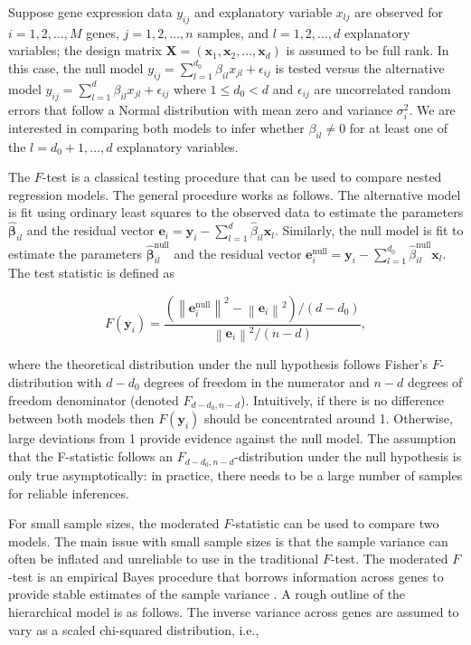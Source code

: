 \documentclass[11pt]{article}
\begin{document}
Suppose gene expression data $y_{ij}$ and explanatory variable $x_{lj}$ are observed for $i=1,2,...,M$ genes, $j=1,2,..., n$ samples, and $l = 1,2,...,d$ explanatory variables; the design matrix $\mathbf{X} = (\mathbf{x}_{1}, \mathbf{x}_{2}, ..., \mathbf{x}_{d})$ is assumed to be full rank. In this case, the null model $y_{ij} = \sum_{l=1}^{d_{0}} \beta_{il}x_{jl} + \epsilon_{ij}$ is tested versus the alternative model $y_{ij} = \sum_{l=1}^{d} \beta_{il}x_{jl} + \epsilon_{ij}$ where $1\leq d_{0}<d$ and $\epsilon_{ij}$ are uncorrelated random errors that follow a Normal distribution with mean zero and variance $\sigma_{i}^{2}$. We are interested in comparing both models to infer whether $\beta_{il} \neq 0$ for at least one of the $l=d_{0} + 1, ...,d$ explanatory variables.

The $F$-test is a classical testing procedure that can be used to compare nested regression models. The general procedure works as follows. The alternative model is fit using ordinary least squares to the observed data to estimate the parameters $\hat{\mathbf{\beta}}_{il}$ and the residual vector $\mathbf{e}_{i} = \mathbf{y}_{i} - \sum_{l=1}^{d} \hat{\beta}_{il} \mathbf{x}_{l}$. Similarly, the null model is fit to estimate the parameters $\hat{\mathbf{\beta}}^{\text{null}}_{il}$ and the residual vector $\mathbf{e}^{\text{null}}_{i}= \mathbf{y}_{i} - \sum_{l=1}^{d_{0}} \hat{\beta}^{\text{null}} _{il} \mathbf{x}_{l}$. The test statistic is defined as 

\begin{equation}
F(\mathbf{y}_{i}) = \dfrac{\left(\left\lVert \mathbf{e}^{\text{null}}_{i}\right\rVert ^{2} -\left\lVert \mathbf{e}_{i} \right\rVert ^ {2} \right)/(d-d_{0})}{\left\lVert \mathbf{e}_{i} \right\rVert ^ {2}/(n-d)},
\end{equation}

\noindent where the theoretical distribution under the null hypothesis follows Fisher's $F$-distribution with $d-d_{0}$ degrees of freedom in the numerator and $n-d$ degrees of freedom denominator (denoted $F_{d-d_{0}, n-d}$). Intuitively, if there is no difference between both models then $F(\mathbf{y}_{i})$ should be concentrated around 1. Otherwise, large deviations from 1 provide evidence against the null model. The assumption that the F-statistic follows an $F_{d-d_{0}, n-d}$-distribution under the null hypothesis is only true asymptotically: in practice, there needs to be a large number of samples for reliable inferences. 

For small sample sizes, the moderated $F$-statistic can be used to compare two models. The main issue with small sample sizes is that the sample variance can often be inflated and unreliable to use in the traditional $F$-test. The moderated $F$-test is an empirical Bayes procedure that borrows information across genes to provide stable estimates of the sample variance \citep{smyth2004linear}. A rough outline of the hierarchical model is as follows. The inverse variance across genes are assumed to vary as a scaled chi-squared distribution, i.e.,
\end{document}

